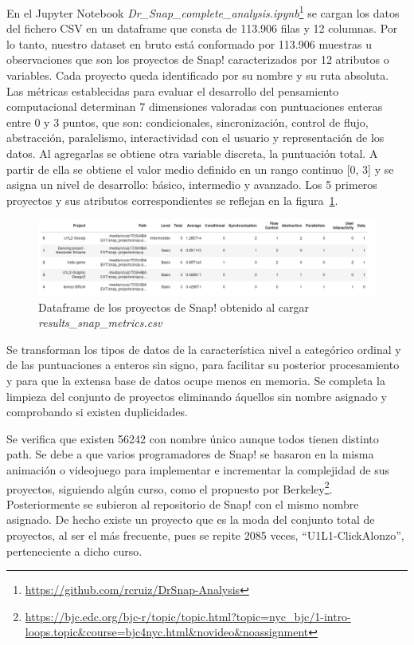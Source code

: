 \documentclass[a4paper, 12pt]{book}
\begin{document}
En el Jupyter Notebook \emph{ Dr\_Snap\_complete\_analysis.ipynb}\footnote{\url{https://github.com/rcruiz/DrSnap-Analysis}} se cargan los datos del fichero CSV en un dataframe que consta de 113.906 filas y 12 columnas. Por lo tanto, nuestro dataset en bruto está conformado por 113.906 muestras u observaciones que son los proyectos de Snap! caracterizados por 12 atributos o variables. Cada proyecto queda identificado por su nombre y su ruta absoluta. 
Las métricas establecidas para evaluar el desarrollo del pensamiento computacional determinan 7 dimensiones valoradas con puntuaciones enteras entre 0 y 3 puntos, que son: condicionales, sincronización, control de flujo, abstracción, paralelismo, interactividad con el usuario y representación de los datos. Al agregarlas se obtiene otra variable discreta, la puntuación total. A partir de ella se obtiene el valor medio definido en un rango continuo [0, 3] y se asigna un nivel de desarrollo: básico, intermedio y avanzado. Los 5 primeros proyectos y sus atributos correspondientes se reflejan en la figura~\ref{fig:df_Snap}.

\begin{figure}[H]
    \centering
    \includegraphics[width=1.0\textwidth]{img/df_origen_Snap.png}
    \caption{Dataframe de los proyectos de Snap! obtenido al cargar \emph{results\_snap\_metrics.csv}}
    \label{fig:df_Snap}
\end{figure}

Se transforman los tipos de datos de la característica nivel a categórico ordinal y de las puntuaciones a enteros sin signo, para facilitar su posterior procesamiento y para que la extensa base de datos ocupe menos en memoria. Se completa la limpieza del conjunto de proyectos eliminando áquellos sin nombre asignado y comprobando si existen duplicidades.

Se verifica que existen 56242 con nombre único aunque todos tienen distinto path. Se debe a que varios programadores de Snap! se basaron en la misma animación o videojuego para implementar e incrementar la complejidad de sus proyectos, siguiendo algún curso, como el propuesto por Berkeley\footnote{\url{https://bjc.edc.org/bjc-r/topic/topic.html?topic=nyc_bjc/1-intro-loops.topic&course=bjc4nyc.html&novideo&noassignment}}. Posteriormente se subieron al repositorio de Snap! con el mismo nombre asignado. De hecho existe un proyecto que es la moda del conjunto total de proyectos, al ser el más frecuente, pues se repite 2085 veces, ``U1L1-ClickAlonzo'', perteneciente a dicho curso.
\end{document}
